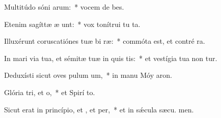 \item Multitúdo sóni arum:~* vocem de bes.
\item Etenim sagíttæ æ unt:~* vox tonítrui tu  ta.
\item Illuxérunt coruscatiónes tuæ bi ræ:~* commóta est, et contré ra.
\item In mari via tua, et sémitæ tuæ in quis tis:~* et vestígia tua non tur.
\item Deduxísti sicut oves pulum um,~* in manu Móy  aron.
\item Glória tri, et o,~* et Spirí to.
\item Sicut erat in princípio, et , et per,~* et in sǽcula sæcu. men.
